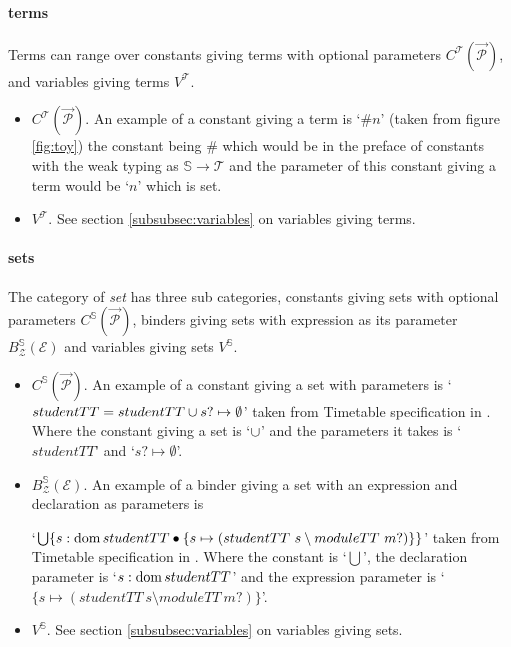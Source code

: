 \paragraph{terms}
\label{subsubsec:terms}

Terms can range over constants giving terms with optional parameters
$C^{\mathcal{T}}(\overrightarrow{\mathcal{P}})$, and variables giving terms
$V^{\mathcal{T}}$.

\begin{itemize}
\item $C^{\mathcal{T}}(\overrightarrow{\mathcal{P}})$. An example of a constant
giving a term is `$\# n$' (taken from figure \ref{fig:toy}) the constant being
$\#$ which would be in the preface of constants with the weak typing as
$\mathbb{S} \rightarrow \mathcal{T}$ and the parameter of this constant giving a
term would be `$n$' which is set.

\item $V^{\mathcal{T}}$. See section \ref{subsubsec:variables} on variables
giving terms.
\end{itemize}

\paragraph{sets}
\label{subsubsec:sets}

The category of \emph{set} has three sub categories, constants giving sets with
optional parameters $C^{\mathbb{S}}(\overrightarrow{\mathcal{P}})$, binders
giving sets with expression as its parameter
$B^{\mathbb{S}}_{\mathcal{Z}}(\mathcal{E})$ and variables giving sets
$V^{\mathbb{S}}$.

\begin{itemize}
\item $C^{\mathbb{S}}(\overrightarrow{\mathcal{P}})$. An example of a constant
giving a set with parameters is
\newline
`$studentTT = studentTT \cup {s? \mapsto \emptyset}$'
\newline
taken from Timetable specification in \cite{essenceofz}. Where the
constant giving a set is `$\cup$' and the parameters it takes is `$studentTT$'
and `${s? \mapsto \emptyset}$'.

\item $B^{\mathbb{S}}_{\mathcal{Z}}(\mathcal{E})$. An example of a binder giving
a set with an expression and declaration as parameters is
\newline

`$\bigcup \{s:\mathop{\mathrm{dom}} studentTT \bullet \{s \mapsto (studentTT~s \setminus
moduleTT~m?)\}\}$' \newline
taken from Timetable specification in \cite{essenceofz}. Where the
constant is `$\bigcup$', the declaration parameter is `$s:\mathop{\mathrm{dom}} studentTT $' and
the expression parameter is `$  \{s \mapsto (studentTT~s \setminus
moduleTT~m?)\}$'.

\item $V^{\mathbb{S}}$. See section \ref{subsubsec:variables} on variables
giving sets.
\end{itemize}

